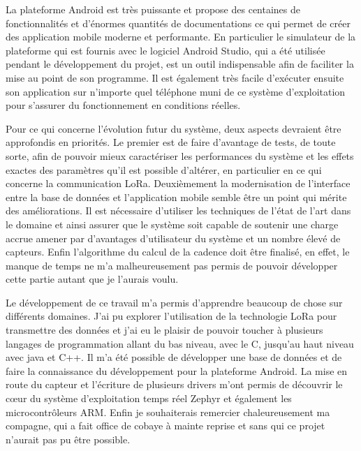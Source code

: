 La plateforme Android est très puissante et propose des centaines de fonctionnalités et d'énormes quantités de documentations ce qui permet de créer des application mobile moderne et performante. En particulier le simulateur de la plateforme qui est fournis avec le logiciel Android Studio, qui a été utilisée pendant le développement du projet, est un outil indispensable afin de faciliter la mise au point de son programme. Il est également très facile d'exécuter ensuite son application sur n'importe quel téléphone muni de ce système d'exploitation pour s'assurer du fonctionnement en conditions réelles.

Pour ce qui concerne l'évolution futur du système, deux aspects devraient être approfondis en priorités. Le premier est de faire d'avantage de tests, de toute sorte, afin de pouvoir mieux caractériser les performances du système et les effets exactes des paramètres qu'il est possible d'altérer, en particulier en ce qui concerne la communication LoRa. Deuxièmement la modernisation de l'interface entre la base de données et l'application mobile semble être un point qui mérite des améliorations. Il est nécessaire d'utiliser les techniques de l'état de l'art dans le domaine et ainsi assurer que le système soit capable de soutenir une charge accrue amener par d'avantages d'utilisateur du système et un nombre élevé de capteurs. Enfin l'algorithme du calcul de la cadence doit être finalisé, en effet,  le manque de temps ne m'a malheureusement pas permis de pouvoir développer cette partie autant que je l'aurais voulu.

Le développement de ce travail m'a permis d'apprendre beaucoup de chose sur différents domaines. J'ai pu explorer l'utilisation de la technologie LoRa pour transmettre des données et j'ai eu le plaisir de pouvoir toucher à plusieurs langages de programmation allant du bas niveau, avec le C, jusqu'au haut niveau avec java et C++. Il m'a été possible de développer une base de données et de faire la connaissance du développement pour la plateforme Android. La mise en route du capteur et l'écriture de plusieurs drivers m'ont permis de découvrir le cœur du système d'exploitation temps réel Zephyr et également les microcontrôleurs ARM. Enfin je souhaiterais remercier chaleureusement ma compagne, qui a fait office de cobaye à mainte reprise et sans qui ce projet n'aurait pas pu être possible.